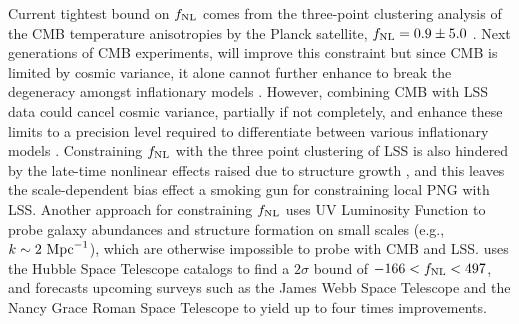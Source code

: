 Current tightest bound on $f_{\rm NL}$ comes from the three-point clustering analysis of the CMB temperature anisotropies by the Planck satellite, $f_{\rm NL}=0.9\pm 5.0$ \citep{akrami2019planck}. Next generations of CMB experiments, will improve this constraint but since CMB is limited by cosmic variance, it alone cannot further enhance to break the degeneracy amongst inflationary models . However, combining CMB with LSS data could cancel cosmic variance, partially if not completely, and enhance these limits to a precision level required to differentiate between various inflationary models \citep[see, e.g.,][]{schmittfull2018PhRvD}.  Constraining $f_{\rm NL}$ with the three point clustering of LSS is also hindered by the late-time nonlinear effects raised due to structure growth , and this leaves the scale-dependent bias effect a smoking gun for constraining local PNG with LSS. Another approach for constraining $f_{\rm NL}$ uses UV Luminosity Function to probe galaxy abundances and structure formation on small scales (e.g., $k \sim 2~{\rm Mpc}^{-1}$), which are otherwise impossible to probe with CMB and LSS. \cite{sabti2021JCAP} uses the Hubble Space Telescope catalogs \citep{bouwens2015ApJ} to find a $2\sigma$ bound of $-166<f_{\rm NL}<497$, and forecasts upcoming surveys such as the James Webb Space Telescope and the Nancy Grace Roman Space Telescope to yield up to four times improvements.

